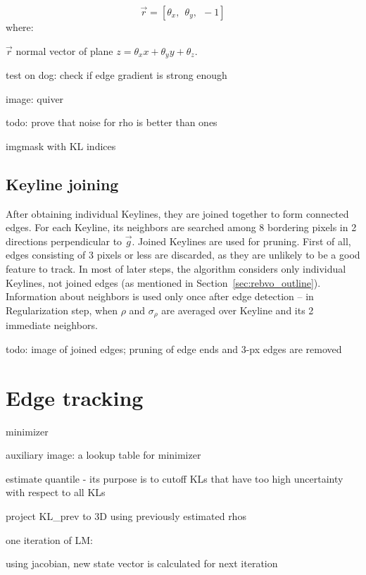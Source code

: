 \begin{equation}
\vec{r} = [\theta_{x},\ \ \theta_{y},\ \ -1]
\label{eq:planenorm}
\end{equation}
where:
\begin{eqwhere}[2cm]
	\item[$\vec{r}$] normal vector of plane $z = \theta_{x}x + \theta_{y}y + \theta_{z}$.
\end{eqwhere}

test on dog: check if edge gradient is strong enough

image: quiver

todo: prove that noise for rho is better than ones

imgmask with KL indices

\subsection{Keyline joining}

After obtaining individual Keylines, they are joined together to form connected edges.
For each Keyline, its neighbors are searched among 8 bordering pixels in 2 directions perpendicular to $\vec{g}$.
Joined Keylines are used for pruning. First of all, edges consisting of 3 pixels or less are discarded, as they are unlikely to be a good feature to track.
In most of later steps, the algorithm considers only individual Keylines, not joined edges (as mentioned in Section~\ref{sec:rebvo_outline}). Information about neighbors is used only once after edge detection -- in Regularization step, when $\rho$ and $\sigma_{\rho}$
are averaged over Keyline and its 2 immediate neighbors.

todo: image of joined edges; pruning of edge ends and 3-px edges are removed



\section{Edge tracking}


minimizer

auxiliary image: a lookup table for minimizer

estimate quantile - its purpose is to cutoff KLs that have too high uncertainty with respect to all KLs

project KL\_prev to 3D using previously estimated rhos

one iteration of LM:

    using jacobian, new state vector is calculated for next iteration

